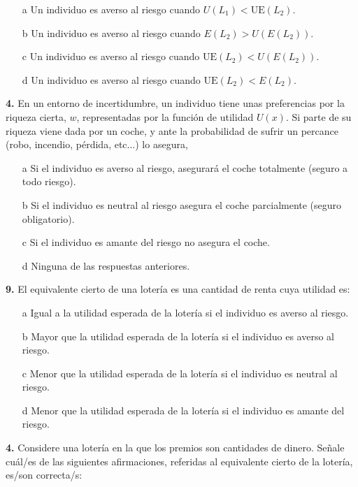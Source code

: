 \documentclass{nuevotema}
\begin{document}
\begin{enumerate}
	\item[a] Un individuo es averso al riesgo cuando $U(L_1) < \text{UE} (L_2)$.
	\item[b] Un individuo es averso al riesgo cuando $E(L_2) > U(E(L_2))$.
	\item[c] Un individuo es averso al riesgo cuando $\text{UE}(L_2) < U(E(L_2))$.
	\item[d] Un individuo es averso al riesgo cuando $\text{UE}(L_2) < E(L_2)$.
\end{enumerate}


\textbf{4.} En un entorno de incertidumbre, un individuo tiene unas preferencias por la riqueza cierta, $w$, representadas por la función de utilidad $U(x)$. Si parte de su riqueza viene dada por un coche, y ante la probabilidad de sufrir un percance (robo, incendio, pérdida, etc...) lo asegura,

\begin{enumerate}
	\item[a] Si el individuo es averso al riesgo, asegurará el coche totalmente (seguro a todo riesgo).
	\item[b] Si el individuo es neutral al riesgo asegura el coche parcialmente (seguro obligatorio).
	\item[c] Si el individuo es amante del riesgo no asegura el coche.
	\item[d] Ninguna de las respuestas anteriores.
\end{enumerate}



\textbf{9.} El equivalente cierto de una lotería es una cantidad de renta cuya utilidad es:

\begin{enumerate}
	\item[a] Igual a la utilidad esperada de la lotería si el individuo es averso al riesgo.
	\item[b] Mayor que la utilidad esperada de la lotería si el individuo es averso al riesgo.
	\item[c] Menor que la utilidad esperada de la lotería si el individuo es neutral al riesgo.
	\item[d] Menor que la utilidad esperada de la lotería si el individuo es amante del riesgo.
\end{enumerate}

\textbf{4.} Considere una lotería en la que los premios son cantidades de dinero. Señale cuál/es de las siguientes afirmaciones, referidas al equivalente cierto de la lotería, es/son correcta/s:
\end{document}

